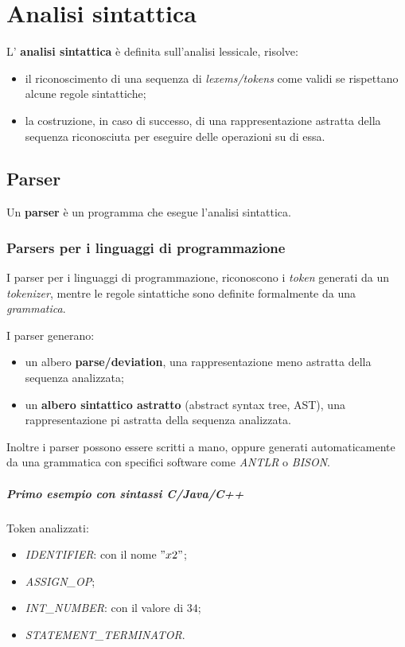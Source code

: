 \chapter{Analisi sintattica}
\begin{theorem}
  L' \textbf{analisi sintattica} è definita sull'analisi lessicale, risolve:
  \begin{itemize}
    \item il riconoscimento di una sequenza di \emph{lexems/tokens} come
      validi se rispettano alcune regole sintattiche;
    \item la costruzione, in caso di successo, di una rappresentazione
      astratta della sequenza riconosciuta per eseguire delle operazioni su
      di essa.
  \end{itemize}
\end{theorem}

\section{Parser}
\begin{theorem}
  Un \textbf{parser} è un programma che esegue l'analisi sintattica.
\end{theorem}

\subsection{Parsers per i linguaggi di programmazione}
I parser per i linguaggi di programmazione, riconoscono i \emph{token}
generati da un \emph{tokenizer}, mentre le regole sintattiche sono definite
formalmente da una \emph{grammatica}.

I parser generano:
\begin{itemize}
  \item un albero \textbf{parse/deviation}, una rappresentazione meno astratta
    della sequenza analizzata;
  \item un \textbf{albero sintattico astratto} (abstract syntax tree, AST),
    una rappresentazione pi
     astratta della sequenza analizzata.
\end{itemize}

Inoltre i parser possono essere scritti a mano, oppure generati automaticamente
da una grammatica con specifici software come \emph{ANTLR} o \emph{BISON}.

\paragraph{Primo esempio con sintassi C/Java/C++}
Token analizzati:
\begin{itemize}
  \item \emph{IDENTIFIER}: con il nome $"x2"$;
  \item \emph{ASSIGN\_OP};
  \item \emph{INT\_NUMBER}: con il valore di $34$;
  \item \emph{STATEMENT\_TERMINATOR}.
\end{itemize}

